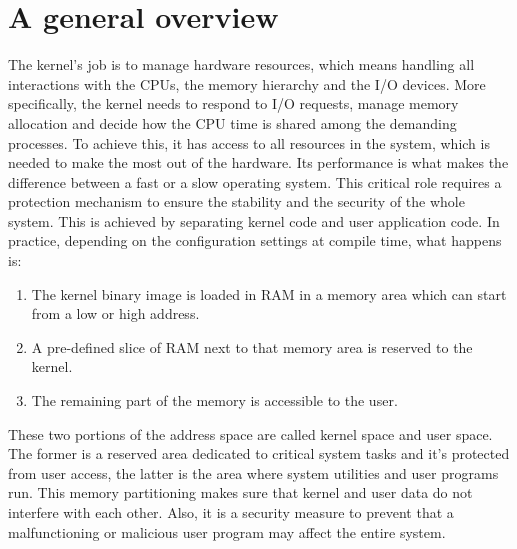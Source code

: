 \section{A general overview} 
\label{sec:general}
The kernel's job is to manage hardware resources, which means handling all interactions with the CPUs, the memory hierarchy and the I/O devices. More specifically, the kernel needs to respond to I/O requests, manage memory allocation and decide how the CPU time is shared among the demanding processes. To achieve this, it has access to all resources in the system, which is needed to make the most out of the hardware. Its performance is what makes the difference between a fast or a slow operating system. This critical role requires a protection mechanism to ensure the stability and the security of the whole system. This is achieved by separating kernel code and user application code. In practice, depending on the configuration settings at compile time, what happens is: 
\begin{enumerate}
    \item The kernel binary image is loaded in RAM in a memory area which can start from a low or high address.
    \item A pre-defined slice of RAM next to that memory area is reserved to the kernel. 
    \item The remaining part of the memory is accessible to the user.
\end{enumerate}
These two portions of the address space %
are called kernel space and user space. The former is a reserved area dedicated to critical system tasks and it's protected from user access, the latter is the area where system utilities and user programs run. This memory partitioning makes sure that kernel and user data do not interfere with each other. Also, it is a security measure to prevent that a malfunctioning or malicious user program may affect the entire system.

